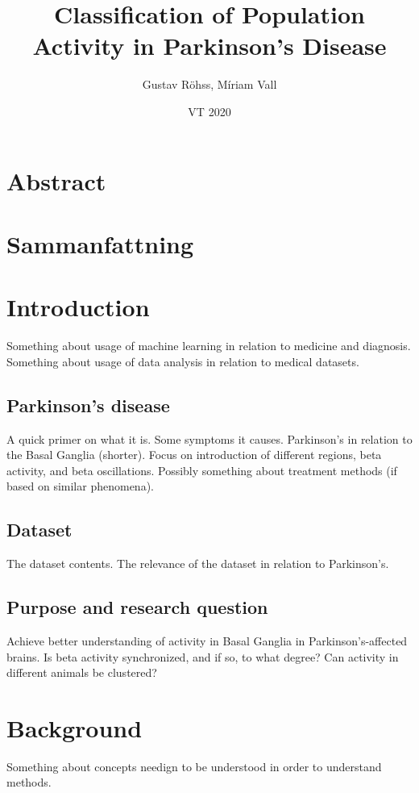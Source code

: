 \documentclass{article}
\title{Classification of Population Activity in Parkinson's Disease}
\author{Gustav Röhss, Míriam Vall}
\date{VT 2020}
\begin{document}
\maketitle

\section*{Abstract}
\section*{Sammanfattning}

\newpage
\tableofcontents

\newpage
\section{Introduction}
Something about usage of machine learning in relation to medicine and diagnosis.
Something about usage of data analysis in relation to medical datasets.

\subsection{Parkinson's disease}
A quick primer on what it is.
Some symptoms it causes.
Parkinson's in relation to the Basal Ganglia (shorter).
Focus on introduction of different regions, beta activity, and beta oscillations.
Possibly something about treatment methods (if based on similar phenomena).

\subsection{Dataset}
The dataset contents.
The relevance of the dataset in relation to Parkinson's.

\subsection{Purpose and research question}
Achieve better understanding of activity in Basal Ganglia in Parkinson's-affected brains.
Is beta activity synchronized, and if so, to what degree?
Can activity in different animals be clustered?

\newpage
\section{Background}
Something about concepts needign to be understood in order to understand methods.
\end{document}
